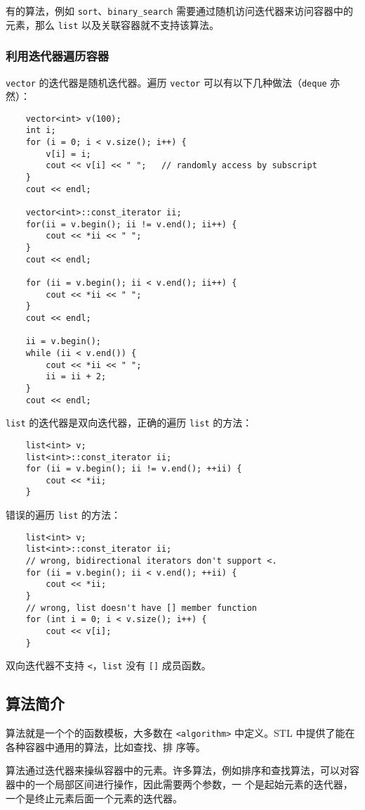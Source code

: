 \documentclass[UTF8]{ctexart}
\begin{document}
有的算法，例如 \texttt{sort}、\texttt{binary\_search} 需要通过随机访问迭代器来访问容器中的元素，那么
\texttt{list} 以及关联容器就不支持该算法。

\subsubsection{利用迭代器遍历容器}
\texttt{vector} 的迭代器是随机迭代器。遍历 \texttt{vector} 可以有以下几种做法（\texttt{deque} 亦然）：
\begin{verbatim}
    vector<int> v(100);
    int i;
    for (i = 0; i < v.size(); i++) {
        v[i] = i;
        cout << v[i] << " ";   // randomly access by subscript
    }
    cout << endl;

    vector<int>::const_iterator ii;
    for(ii = v.begin(); ii != v.end(); ii++) {
        cout << *ii << " ";
    }
    cout << endl;

    for (ii = v.begin(); ii < v.end(); ii++) {
        cout << *ii << " ";
    }
    cout << endl;

    ii = v.begin();
    while (ii < v.end()) {
        cout << *ii << " ";
        ii = ii + 2;
    }
    cout << endl;
\end{verbatim}

\texttt{list} 的迭代器是双向迭代器，正确的遍历 \texttt{list} 的方法：
\begin{verbatim}
    list<int> v;
    list<int>::const_iterator ii;
    for (ii = v.begin(); ii != v.end(); ++ii) {
        cout << *ii;
    }
\end{verbatim}

错误的遍历 \texttt{list} 的方法：
\begin{verbatim}
    list<int> v;
    list<int>::const_iterator ii;
    // wrong, bidirectional iterators don't support <.
    for (ii = v.begin(); ii < v.end(); ++ii) {
        cout << *ii;
    }
    // wrong, list doesn't have [] member function
    for (int i = 0; i < v.size(); i++) {
        cout << v[i];
    }
\end{verbatim}
双向迭代器不支持 \texttt{<}，\texttt{list} 没有 \texttt{[]} 成员函数。

\subsection{算法简介}
算法就是一个个的函数模板，大多数在 \texttt{<algorithm>} 中定义。STL 中提供了能在各种容器中通用的算法，比如查找、排
序等。

算法通过迭代器来操纵容器中的元素。许多算法，例如排序和查找算法，可以对容器中的一个局部区间进行操作，因此需要两个参数，一
个是起始元素的迭代器，一个是终止元素后面一个元素的迭代器。
\end{document}
